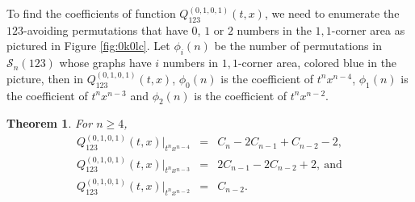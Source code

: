 \documentclass[
final,nomarks
]{dmtcs-episciences}
\newtheorem{theorem}{Theorem}
\newcommand{\fref}[1]{Figure \ref{fig:#1}}
\newcommand{\Sn}[1]{\mathcal{S}_{#1}}
\newcommand{\Qm}[1]{Q_{123}^{(#1)}(t,x)}
\begin{document}
To find the coefficients of function \begin{math}\Qm{0,1,0,1}\end{math}, we need to enumerate the \begin{math}123\end{math}-avoiding permutations that have \begin{math}0\end{math}, \begin{math}1\end{math} or \begin{math}2\end{math} numbers in the \begin{math}1,1\end{math}-corner area as pictured in \fref{0k0lc}. 
Let \begin{math}\phi_i(n)\end{math} be the number of permutations in \begin{math}\Sn{n}(123)\end{math} whose graphs have \begin{math}i\end{math} numbers in \begin{math}1,1\end{math}-corner area, colored blue in the picture, then in \begin{math}\Qm{0,1,0,1}\end{math}, \begin{math}\phi_0(n)\end{math} is the coefficient of \begin{math}t^n x^{n-4}\end{math}, \begin{math}\phi_1(n)\end{math} is the coefficient of \begin{math}t^n x^{n-3}\end{math} and \begin{math}\phi_2(n)\end{math} is the coefficient of \begin{math}t^n x^{n-2}\end{math}. 

\begin{theorem}\label{theorem:16}
	For \begin{math}n\geq 4\end{math}, 
	\begin{eqnarray}
		\Qm{0,1,0,1}\big|_{t^n x^{n-4}}&=& C_n-2C_{n-1}+C_{n-2}-2, \\
		\Qm{0,1,0,1}\big|_{t^n x^{n-3}}&=&2C_{n-1}-2C_{n-2}+2, \ \mbox{and} \\
		\Qm{0,1,0,1}\big|_{t^n x^{n-2}}&=& C_{n-2}.
	\end{eqnarray}
\end{theorem}
\end{document}
